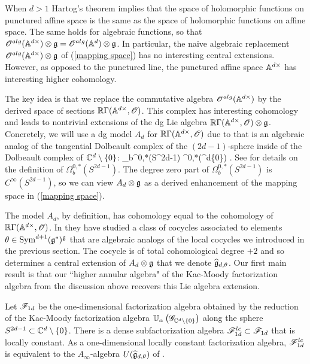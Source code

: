 \documentclass[10pt]{amsart}
\begin{document}
When $d > 1$ Hartog's theorem implies that the space of holomorphic functions on punctured affine space is the same as the space of holomorphic functions on affine space.
The same holds for algebraic functions, so that $\sO^{alg}(\AA^{d\times}) \tensor \fg = \sO^{alg}(\AA^d) \tensor \fg$. 
In particular, the naive algebraic replacement $\sO^{alg}(\AA^{d\times}) \tensor \fg$ of (\ref{mapping space}) has no interesting central extensions. 
However, as opposed to the punctured line, the punctured affine space $\AA^{d \times}$ has interesting higher cohomology. 

The key idea is that we replace the commutative algebra $\sO^{alg}(\AA^{d\times})$ by the derived space of sections $\RR \Gamma(\AA^{d \times}, \sO)$. 
This complex has interesting cohomology and leads to nontrivial extensions of the dg Lie algebra $\RR \Gamma(\AA^{d \times}, \sO) \tensor \fg$. 
Concretely, we will use a dg model $A_d$ for $\RR \Gamma(\AA^{d \times}, \sO)$ due to \cite{FHK} that is an algebraic analog of the tangential Dolbeault complex of the $(2d-1)$-sphere inside of the Dolbeault complex of $\CC^d \setminus \{0\}$:
\ben
\Omega_b^{0,*}(S^{2d-1}) \subset \Omega^{0,*}(\CC^d\setminus \{0\}) .
\een
See \cite{DT} for details on the definition of $\Omega_b^{0,*}(S^{2d-1})$. 
The degree zero part of $\Omega_b^{0,*}(S^{2d-1})$ is $C^\infty(S^{2d-1})$, so we can view $A_d \tensor \fg$ as a derived enhancement of the mapping space in (\ref{mapping space}). 

The model $A_d$, by definition, has cohomology equal to the cohomology of $\RR \Gamma(\AA^{d \times}, \sO)$. 
In \cite{FHK} they have studied a class of cocycles associated to elements $\theta \in \Sym^{d+1}(\fg^*)^\fg$ that are algebraic analogs of the local cocycles we introduced in the previous section. 
The cocycle is of total cohomological degree $+2$ and so determines a central extension of $A_d \tensor \fg$ that we denote $\Hat{\fg}_{d,\theta}$. 
Our first main result is that our ``higher annular algebra" of the Kac-Moody factorization algebra from the discussion above recovers this Lie algebra extension.

\begin{thm}\label{thm sphere alg}
Let $\sF_{1d}$ be the one-dimensional factorization algebra obtained by the reduction of the Kac-Moody factorization algebra $\UU_\alpha\left(\sG_{\CC^{d} \setminus \{0\}} \right)$ along the sphere $S^{2d-1} \subset \CC^{d} \setminus \{0\}$.
There is a dense subfactorization algebra $\sF^{lc}_{1d} \subset \sF_{1d}$ that is locally constant. 
As a one-dimensional locally constant factorization algebra, $\sF^{lc}_{1d}$ is equivalent to the $A_\infty$-algebra $U(\Hat{\fg}_{d,\theta})$ of \cite{FHK}.
\end{thm}
\end{document}

